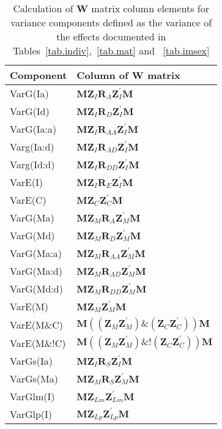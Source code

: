 \begin{table}
\centering
\caption{Calculation of ${\bm W}$ matrix column elements for variance components defined as the variance of the effects documented in Tables~\ref{tab.indiv},~\ref{tab.mat} and ~\ref{tab.imsex}}
\label{tab.wcol}
\vspace{0.1in}
\begin{tabular}{l|l}
Component & Column of ${\bm W}$ matrix \\ \hline
VarG(Ia)      &  ${\bm M \bm Z_{I} \bm R_{A} \bm Z_{I}^{\prime} \bm M }$    \\
VarG(Id)      &  ${\bm M \bm Z_{I} \bm R_{D} \bm Z_{I}^{\prime} \bm M }$   \\
VarG(Ia:a)    &  ${\bm M \bm Z_{I} \bm R_{AA} \bm Z_{I}^{\prime} \bm M }$   \\
Varg(Ia:d)    &  ${\bm M \bm Z_{I} \bm R_{AD} \bm Z_{I}^{\prime} \bm M }$  \\
Varg(Id:d)    &  ${\bm M \bm Z_{I} \bm R_{DD} \bm Z_{I}^{\prime} \bm M }$  \\
VarE(I)       &  ${\bm M \bm Z_{I} \bm R_{E} \bm Z_{I}^{\prime} \bm M }$  \\
VarE(C)       &  ${\bm M \bm Z_{C} \bm Z_{C}^{\prime} \bm M }$  \\    \hline
VarG(Ma)      &  ${\bm M \bm Z_{M} \bm R_{A} \bm Z_{M}^{\prime} \bm M }$  \\
VarG(Md)      &  ${\bm M \bm Z_{M} \bm R_{D} \bm Z_{M}^{\prime} \bm M }$  \\
VarG(Ma:a)    &  ${\bm M \bm Z_{M} \bm R_{AA} \bm Z_{M}^{\prime} \bm M }$  \\
VarG(Ma:d)    &  ${\bm M \bm Z_{M} \bm R_{AD} \bm Z_{M}^{\prime} \bm M }$  \\
VarG(Md:d)    &  ${\bm M \bm Z_{M} \bm R_{DD} \bm Z_{M}^{\prime} \bm M }$  \\
VarE(M)       &  ${\bm M \bm Z_{M}  \bm Z_{M}^{\prime} \bm M }$  \\
VarE(M\&C)    &  ${\bm M ((\bm Z_{M} \bm Z_{M}^{\prime}) \& (\bm Z_{C} \bm Z_{C}^{\prime})) \bm M }$  \\
VarE(M\&!C)   &  ${\bm M ((\bm Z_{M} \bm Z_{M}^{\prime}) \&! (\bm Z_{C} \bm Z_{C}^{\prime})) \bm M }$  \\  \hline
VarGs(Ia)     &  ${\bm M \bm Z_{I} \bm R_{S} \bm Z_{I}^{\prime} \bm M }$  \\
VarGs(Ma)     &  ${\bm M \bm Z_{M} \bm R_{S} \bm Z_{M}^{\prime} \bm M }$  \\ \hline
VarGlm(I)     &  ${\bm M \bm Z_{Lm} \bm Z_{Lm}^{\prime} \bm M }$  \\
VarGlp(I)     &  ${\bm M \bm Z_{Lp} \bm Z_{Lp}^{\prime} \bm M }$  \\ \hline
\end{tabular}
\end{table}
